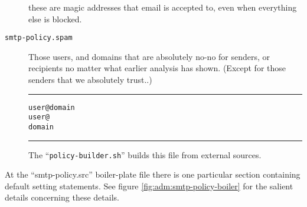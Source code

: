 \begin{description}
these are magic addresses that email is accepted to, even when everything
else is blocked. 

\item[\tt smtp-policy.spam] \mbox{}

Those users, and domains that are absolutely no-no for senders,
or recipients no matter what earlier analysis has shown.
(Except for those senders that we absolutely trust..)

\begin{alltt}\medskip\hrule\medskip
 user@domain
 user@
 domain
\medskip\hrule\end{alltt}\medskip

The ``{\tt policy-builder.sh}'' builds this file from external sources. 

\end{description}



At the ``smtp-policy.src'' boiler-plate file there is one
particular section containing default setting statements.
See figure \vref{fig:adm:smtp-policy-boiler} for the salient
details concerning these details.

